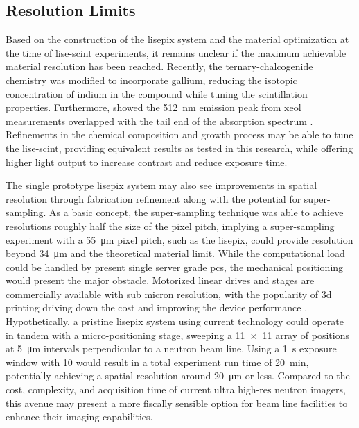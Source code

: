 \documentclass[../../../main.tex]{subfiles}%
\begin{document}
%
    \subsection{Resolution Limits}%
    \label{sec:chapter-5:outcomes:resolution-limits}%
    Based on the construction of the \gls{lisepix} system and the material optimization at the time of \gls{lise-scint} experiments, it remains unclear if the maximum achievable material resolution has been reached.
    Recently, the \gls{ternary-chalcogenide} chemistry was modified to incorporate gallium, reducing the isotopic concentration of indium in the compound while tuning the scintillation properties.
    Furthermore, \citeauthor*{Wiggins_2015} showed the \SI{512}{\nano\meter} emission peak from \gls{xeol} measurements overlapped with the tail end of the absorption spectrum \cite{Wiggins_2015}.
    Refinements in the chemical composition and growth process may be able to tune the \gls{lise-scint}, providing equivalent results as tested in this research, while offering higher light output to increase contrast and reduce exposure time.
    \par%
    The single prototype \gls{lisepix} system may also see improvements in spatial resolution through fabrication refinement along with the potential for \gls{super-sampling}.
    As a basic concept, the \gls{super-sampling} technique was able to achieve resolutions roughly half the size of the pixel pitch, implying a \gls{super-sampling} experiment with a \SI{55}{\micro\meter} pixel pitch, such as the \gls{lisepix}, could provide resolution beyond \SI{34}{\micro\meter} and the theoretical material limit. 
    While the computational load could be handled by present single server grade \glspl{pc}, the mechanical positioning would present the major obstacle.
    Motorized linear drives and stages are commercially available with sub micron resolution, with the popularity of \gls{3d} printing driving down the cost and improving the device performance \cite{Campbell_2014}.
    Hypothetically, a pristine \gls{lisepix} system using current technology could operate in tandem with a micro-positioning stage, sweeping a \num{11x11} array of positions at \SI{5}{\micro\meter} intervals perpendicular to a neutron beam line.
    Using a \SI{1}{\second} exposure window with \SI{10}{\frames} would result in a total experiment run time of \SI{20}{\minute}, potentially achieving a spatial resolution around \SI{20}{\micro\meter} or less.
    Compared to the cost, complexity, and acquisition time of current ultra \gls{high-res} neutron imagers, this avenue may present a more fiscally sensible option for beam line facilities to enhance their imaging capabilities.
\end{document}
